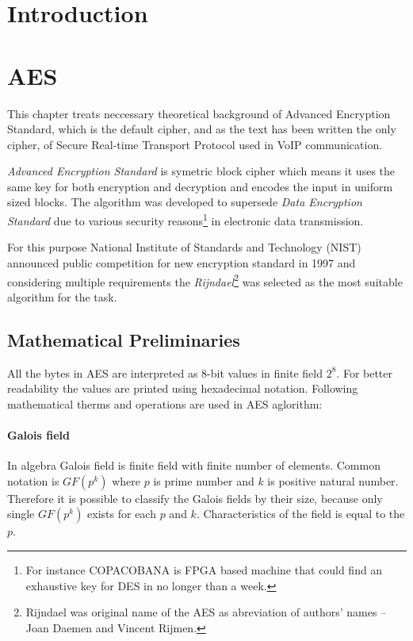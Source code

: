 
\chapter{Introduction}

\chapter{AES}
This chapter treats neccessary theoretical background of Advanced Encryption 
Standard, which is the default cipher, and as the text has been written the only
cipher, of Secure Real-time Transport Protocol used in VoIP communication.

\textit{Advanced Encryption Standard} is symetric block cipher which means 
it uses the same key for both encryption and decryption and encodes the
input in uniform sized blocks. The algorithm was developed to supersede
\textit{Data Encryption Standard} due to various security reasons\footnote
{ For instance COPACOBANA is FPGA based machine that could find 
an exhaustive key for DES in no longer than a week\cite{copacobana}.} in 
electronic data transmission. 

For this purpose National Institute of Standards and Technology (NIST)
announced public competition for new encryption standard in 1997 and 
considering multiple requirements the \textit{Rijndael}\footnote{ Rijndael
was original name of the AES as abreviation of authors' names -- Joan 
Daemen and Vincent Rijmen.} was selected as the most suitable algorithm
for the task\cite{AES-FIPS}. 

\section{Mathematical Preliminaries}
All the bytes in AES are interpreted as 8-bit values in finite field $2^8$.
For better readability the values are printed using hexadecimal notation.
Following mathematical therms and operations are used in AES aglorithm:

\subsubsection*{Galois field}
In algebra Galois field is finite field with finite number of elements.
Common notation is $GF(p^k)$ where $p$ is prime number and $k$ is positive
natural number. Therefore it is possible to classify the Galois fields 
by their size, because only single $GF(p^k)$ exists for each $p$ and $k$.
Characteristics of the field is equal to the $p$.

